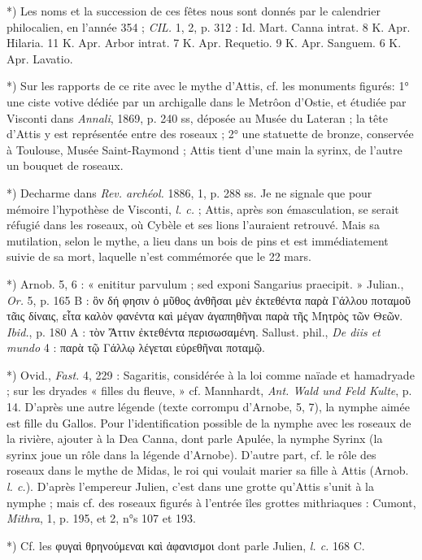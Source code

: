 \documentclass[a4paper, 11pt, oneside, polutonikogreek, french]{article}
\begin{document}
*) Les noms et la succession de ces fêtes nous sont donnés par le calendrier philocalien, en l'année 354 ; \emph{CIL.} 1, 2, p. 312 :  
Id. Mart. Canna intrat. 8 K. Apr. Hilaria.  
11 K. Apr. Arbor intrat. 7 K. Apr. Requetio.  
9 K. Apr. Sanguem. 6 K. Apr. Lavatio.  

*) Sur les rapports de ce rite avec le mythe d'Attis, cf. les monuments figurés: 1° une ciste votive dédiée par un archigalle dans le Metrôon d'Ostie, et étudiée par Visconti dans \emph{Annali}, 1869, p. 240 ss, déposée au Musée du Lateran ; la tête d'Attis y est représentée entre des roseaux ; 2° une statuette de bronze, conservée à Toulouse, Musée Saint-Raymond ; Attis tient d'une main la syrinx, de l'autre un bouquet de roseaux.

*) Decharme dans \emph{Rev. archéol.} 1886, 1, p. 288 ss. Je ne signale que pour mémoire l'hypothèse de Visconti, \emph{l. c.} ; Attis, après son émasculation, se serait réfugié dans les roseaux, où Cybèle et ses lions l'auraient retrouvé. Mais sa mutilation, selon le mythe, a lieu dans un bois de pins et est immédiatement suivie de sa mort, laquelle n'est commémorée que le 22 mars.

*) Arnob. 5, 6 : « enititur parvulum ; sed exponi Sangarius praecipit. » Julian., \emph{Or.} 5, p. 165 B : ὃν δή φησιν ὁ μῦθος ἀνθῆσαι μὲν ἐκτεθέντα παρὰ Γάλλου ποταμοῦ τᾶις δίναις, εἶτα καλὸν φανέντα καὶ μέγαν ἀγαπηθῆναι παρὰ τῆς Μητρὸς τῶν Θεῶν. \emph{Ibid.}, p. 180 A : τὸν Ἄττιν ἐκτεθέντα περισωσαμένη. Sallust. phil., \emph{De diis et mundo} 4 : παρὰ τῷ Γάλλῳ λέγεται εὐρεθῆναι ποταμῷ.

*) Ovid., \emph{Fast.} 4, 229 : Sagaritis, considérée à la loi comme naïade et hamadryade ; sur les dryades « filles du fleuve, » cf. Mannhardt, \emph{Ant. Wald und Feld Kulte}, p. 14. D'après une autre légende (texte corrompu d'Arnobe, 5, 7), la nymphe aimée est fille du Gallos. Pour l'identification possible de la nymphe avec les roseaux de la rivière, ajouter à la Dea Canna, dont parle Apulée, la nymphe Syrinx (la syrinx joue un rôle dans la légende d'Arnobe). D'autre part, cf. le rôle des roseaux dans le mythe de Midas, le roi qui voulait marier sa fille à Attis (Arnob. \emph{l. c.}). D'après l'empereur Julien, c'est dans une grotte qu'Attis s'unit à la nymphe ; mais cf. des roseaux figurés à l'entrée îles grottes mithriaques : Cumont, \emph{Mithra}, 1, p. 195, et 2, n°s 107 et 193.

*) Cf. les φυγαὶ θρηνούμεναι καὶ ἀφανισμοι dont parle Julien, \emph{l. c.} 168 C.
\end{document}
